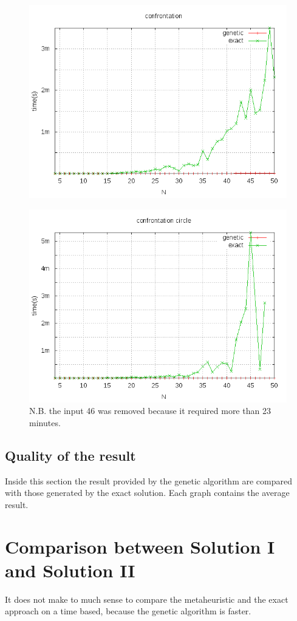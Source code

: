 \begin{figure}
	\label{fig:comparison}
	\centering
	\includegraphics[scale=0.5]{img/confronto_random_exact_genetic.png}
\end{figure}

\begin{figure}
	\centering
	\includegraphics[scale=0.5]{img/confronto_circle_exact_genetic.png}
	\caption{N.B. the input 46 was removed because it required more than 23 minutes.}
\end{figure}

\subsection{Quality of the result}
Inside this section the result provided by the genetic algorithm are compared with
those generated by the exact solution.
Each graph contains the average result.

\section{Comparison between Solution I and Solution II}
It does not make to much sense to compare the metaheuristic and the
exact approach on a time based, because the genetic algorithm is faster.

